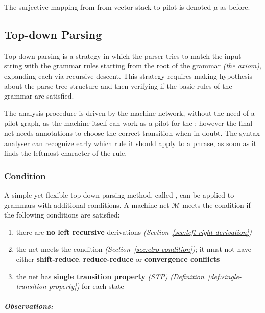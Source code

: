 \documentclass[english]{article}
\begin{document}
\bigskip
The surjective mapping from from vector-stack \mstates to pilot \mstates is denoted \(\mu\) as before.

\subsection{Top-down Parsing}
\label{sec:top-down}

Top-down parsing is a strategy in which the parser tries to match the input string with the grammar rules starting from the root of the grammar \textit{(the axiom)}, expanding each \RP via recursive descent.
This strategy requires making hypothesis about the parse tree structure and then verifying if the basic rules of the grammar are satisfied.

\bigskip
The analysis procedure is driven by the machine network, without the need of a pilot graph, as the machine itself can work as a pilot for the \PDA;
however the final net needs annotations to choose the correct transition when in doubt.
The syntax analyser can recognize early which rule it should apply to a phrase, as soon as it finds the leftmost character of the rule.

\subsubsection[ELL(1) Condition]{\ello Condition}

A simple yet flexible top-down parsing method, called \ello, can be applied to \elro grammars with additional conditions.
A machine net \(\mathcal{M}\) meets the \ello condition if the following conditions are satisfied:

\begin{enumerate}[label=\arabic*., ref=(\arabic*)]
  \item\label{enum:ell1-condition-1} there are \textbf{no left recursive} derivations \textit{(Section~\ref{sec:left-right-derivation})}
  \item\label{enum:ell1-condition-2} the net meets the \elro condition \textit{(Section~\ref{sec:elro-condition})}; it must not have either \textbf{shift-reduce}, \textbf{reduce-reduce} or \textbf{convergence conflicts}
  \item\label{enum:ell1-condition-3} the net has \textbf{single transition property} \textit{(STP)} \textit{(Definition~\ref{def:single-transition-property})} for each state
\end{enumerate}

\bigskip
\subparagraph*{Observations:}
\end{document}
